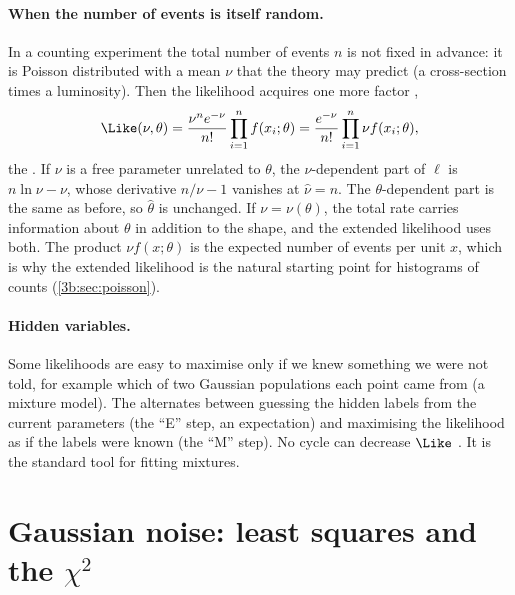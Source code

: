 \paragraph{When the number of events is itself random.}
In a counting experiment the total number of events $n$ is not fixed in
advance: it is Poisson distributed with a mean $\nu$ that the theory may
predict (a cross-section times a luminosity). Then the likelihood acquires
one more factor ,
\begin{equation}
  \Like(\nu,\theta)=\frac{\nu^n e^{-\nu}}{n!}\prod_{i=1}^nf(x_i;\theta)
  =\frac{e^{-\nu}}{n!}\prod_{i=1}^n\nu f(x_i;\theta),
  \label{3b:eq:extended}
\end{equation}
the . If $\nu$ is a free parameter unrelated to
$\theta$, the $\nu$-dependent part of $\ell$ is $n\ln\nu-\nu$, whose
derivative $n/\nu-1$ vanishes at $\hat\nu=n$. The $\theta$-dependent part is
the same as before, so $\hat\theta$ is unchanged. If $\nu=\nu(\theta)$, the
total rate carries information about
$\theta$ in addition to the shape, and the extended likelihood uses both.
The product $\nu f(x;\theta)$ is the expected number of events per unit
$x$, which is why the extended likelihood is the natural starting point for
histograms of counts (\cref{3b:sec:poisson}).

\paragraph{Hidden variables.}
Some likelihoods are easy to maximise only if we knew something we were
not told, for example which of two Gaussian populations each point came
from (a mixture model). The  alternates between
guessing the hidden labels from the current parameters (the ``E'' step, an
expectation) and maximising the likelihood as if the labels were known (the
``M'' step). No cycle can decrease $\Like$ . It is
the standard tool for fitting mixtures.
\section{Gaussian noise: least squares and the \texorpdfstring{$\chi^2$}{chi-square}}
\label{3b:sec:least-squares}

